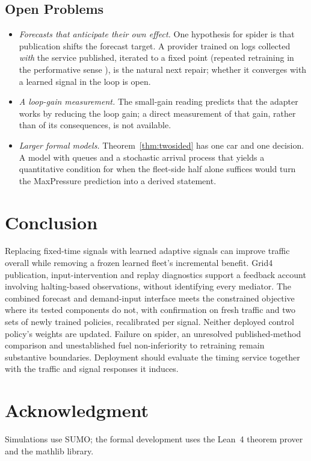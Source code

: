 \subsection{Open Problems}
\begin{itemize}\setlength\itemsep{1pt}
\item \emph{Forecasts that anticipate their own effect.} One hypothesis for spider is that publication shifts the forecast target. A provider
trained on logs collected \emph{with} the service published, iterated to a fixed point (repeated retraining in the performative sense
\cite{perdomo2020}), is the natural next repair; whether it converges with a learned signal in the loop is open.
\item \emph{A loop-gain measurement.} The small-gain reading predicts that the adapter works by reducing the loop gain; a direct
measurement of that gain, rather than of its consequences, is not available.
\item \emph{Larger formal models.} Theorem~\ref{thm:twosided} has one car and one decision. A model with queues and a stochastic arrival
process that yields a quantitative condition for when the fleet-side half alone suffices would turn the MaxPressure prediction into a
derived statement.
\end{itemize}

\section{Conclusion}\label{sec:conclusion}
Replacing fixed-time signals with learned adaptive signals can improve traffic overall while removing a frozen learned fleet's incremental benefit. Grid4 publication, input-intervention and replay diagnostics support a feedback account involving halting-based observations, without identifying every mediator. The combined forecast and demand-input interface meets the constrained objective where its tested components do not, with confirmation on fresh traffic and two sets of newly trained policies, recalibrated per signal. Neither deployed control policy's weights are updated. Failure on spider, an unresolved published-method comparison and unestablished fuel non-inferiority to retraining remain substantive boundaries. Deployment should evaluate the timing service together with the traffic and signal responses it induces.

\section*{Acknowledgment}
Simulations use SUMO; the formal development uses the Lean~4 theorem prover and the mathlib library.

